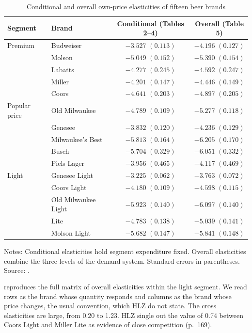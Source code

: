 \begin{table}[htbp]
\centering
\caption{Conditional and overall own-price elasticities of fifteen beer brands}\label{tab:05-hlz-own}
\begin{threeparttable}
\begin{tabular}{@{}llcc@{}}
\toprule
Segment & Brand & Conditional (Tables 2--4) & Overall (Table 5) \\
\midrule
Premium & Budweiser & $-3.527$ $(0.113)$ & $-4.196$ $(0.127)$ \\
 & Molson & $-5.049$ $(0.152)$ & $-5.390$ $(0.154)$ \\
 & Labatts & $-4.277$ $(0.245)$ & $-4.592$ $(0.247)$ \\
 & Miller & $-4.201$ $(0.147)$ & $-4.446$ $(0.149)$ \\
 & Coors & $-4.641$ $(0.203)$ & $-4.897$ $(0.205)$ \\
\addlinespace
Popular price & Old Milwaukee & $-4.789$ $(0.109)$ & $-5.277$ $(0.118)$ \\
 & Genesee & $-3.832$ $(0.120)$ & $-4.236$ $(0.129)$ \\
 & Milwaukee's Best & $-5.813$ $(0.164)$ & $-6.205$ $(0.170)$ \\
 & Busch & $-5.704$ $(0.329)$ & $-6.051$ $(0.332)$ \\
 & Piels Lager & $-3.956$ $(0.465)$ & $-4.117$ $(0.469)$ \\
\addlinespace
Light & Genesee Light & $-3.225$ $(0.062)$ & $-3.763$ $(0.072)$ \\
 & Coors Light & $-4.180$ $(0.109)$ & $-4.598$ $(0.115)$ \\
 & Old Milwaukee Light & $-5.923$ $(0.140)$ & $-6.097$ $(0.140)$ \\
 & Lite & $-4.783$ $(0.138)$ & $-5.039$ $(0.141)$ \\
 & Molson Light & $-5.682$ $(0.147)$ & $-5.841$ $(0.148)$ \\
\bottomrule
\end{tabular}
\begin{tablenotes}[flushleft]\footnotesize
\item Notes: Conditional elasticities hold segment expenditure fixed. Overall elasticities combine the three levels
of the demand system. Standard errors in parentheses. Source: \citet[Tables 2, 3, 4 and 5]{HausmanLeonardZona1994}.
\end{tablenotes}
\end{threeparttable}
\end{table}

 reproduces the full matrix of overall elasticities within the light segment. We read rows
as the brand whose quantity responds and columns as the brand whose price changes, the usual convention, which
HLZ do not state. The cross elasticities are large, from 0.20 to 1.23. HLZ single out the value of 0.74 between
Coors Light and Miller Lite as evidence of close competition (p.~169).

